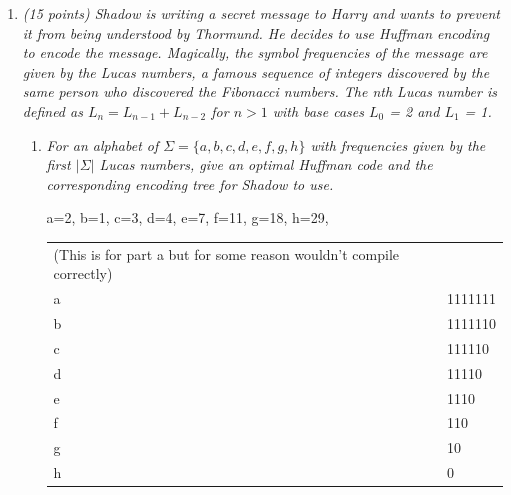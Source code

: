 \documentclass[12pt]{article}
\begin{document}
\renewcommand{\headrulewidth}{0.4pt}


\vspace{-3mm}
\begin{enumerate}

	\item \textit{ (15 points) Shadow is writing a secret message to Harry and wants to prevent it from being understood by Thormund. He decides to use Huffman encoding to encode the message. Magically, the symbol frequencies of the message are given by the Lucas numbers, a famous sequence of integers discovered by the same person who discovered the Fibonacci numbers. The nth Lucas number is defined as $L_n = L_{n-1} + L_{n-2}$ for $n > 1$ with base cases $L_0$ = 2 and $L_1$ = 1.}
	\begin{enumerate}
	\item\textit{  \label{q:huff:a} For an alphabet of $\Sigma=\{a,b,c,d,e,f,g,h\}$ with frequencies given by the first $|\Sigma|$ Lucas numbers, give an optimal Huffman code and the corresponding encoding tree for Shadow to use.}
	
a=2, b=1, c=3, d=4, e=7, f=11, g=18, h=29, 





\begin{table}[]
\begin{tabular}{ll}
(This is for part a but for some reason wouldn't compile correctly) \\
  a & 1111111 \\
  b & 1111110 \\
  c & 111110 \\
  d & 11110 \\
  e & 1110 \\
  f & 110 \\
  g & 10 \\
  h & 0 \\ 
\end{tabular}
\end{table} 


\end{enumerate}
\end{enumerate}
\end{document}

